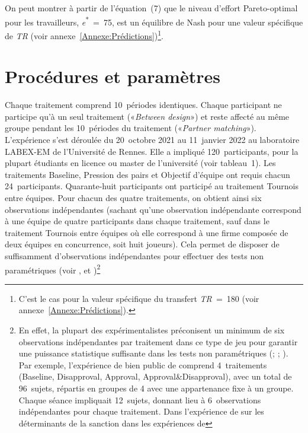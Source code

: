 \begin{Article}
\begin{refsection}[Lebourges]
On peut montrer à partir de l'équation~(7) que le niveau d'effort
Pareto-optimal pour les travailleurs, \emph{e}\textsuperscript{*}~=~75,
est un équilibre de Nash pour une valeur spécifique de \emph{TR} (voir
annexe~\ref{Annexe:Prédictions})\footnote{C'est le cas pour la valeur spécifique du transfert
  \emph{TR~}=~180 (voir annexe~\ref{Annexe:Prédictions}).}.

\section{Procédures et paramètres}
\label{section:procédures}

Chaque traitement comprend 10~périodes identiques. Chaque participant ne
participe qu'à un seul traitement («\emph{Between design}») et reste
affecté au même groupe pendant les 10~périodes du traitement
(«\emph{Partner matching}»). L'expérience s'est déroulée du 20~octobre
2021 au 11~janvier 2022 au laboratoire LABEX-EM de l'Université de
Rennes. Elle a impliqué 120~participants, pour la plupart étudiants en
licence ou master de l'université (voir tableau~1). Les traitements
Baseline, Pression des pairs et Objectif d'équipe ont requis chacun
24~participants. Quarante-huit participants ont participé au traitement
Tournois entre équipes. Pour chacun des quatre traitements, on obtient
ainsi six observations indépendantes (sachant qu'une observation
indépendante correspond à une équipe de quatre participants dans chaque
traitement, sauf dans le traitement Tournois entre équipes où elle
correspond à une firme composée de deux équipes en concurrence, soit
huit joueurs). Cela permet de disposer de suffisamment d'observations
indépendantes pour effectuer des tests non paramétriques (voir \textcite{Dugar2013}, \textcite{Nikiforakis2008} et \textcite{NalbantianSchotter1997})\footnote{En effet, la plupart des expérimentalistes
  préconisent un minimum de six observations indépendantes par
  traitement dans ce type de jeu pour garantir une puissance statistique
  suffisante dans les tests non paramétriques (\textcite{Dugar2013}; \textcite{NikiforakisNormann2008}; \textcite{NalbantianSchotter1997}). Par exemple, l'expérience de bien public de \textcite{Dugar2013} comprend 4~traitements (Baseline, Disapproval, Approval,
  Approval\&Disapproval), avec un total de 96~sujets, répartis en
  groupes de 4 avec une appartenance fixe à un groupe. Chaque séance
  impliquait 12~sujets, donnant lieu à 6~observations indépendantes pour
  chaque traitement. Dans l'expérience de \textcite{Nikiforakis2008} sur les déterminants de la sanction dans les expériences de
}
\end{refsection}
\end{Article}
